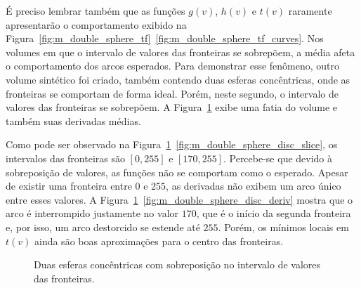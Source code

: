 	É preciso lembrar também que as funções $ g(v) $, $ h(v) $ e $ t(v) $ raramente apresentarão o comportamento exibido na Figura~\ref{fig:m_double_sphere_tf}~\ref{fig:m_double_sphere_tf_curves}. Nos volumes em que o intervalo de valores das fronteiras se sobrepõem, a média afeta o comportamento dos arcos esperados. Para demonstrar esse fenômeno, outro volume sintético foi criado, também contendo duas esferas concêntricas, onde as fronteiras se comportam de forma ideal. Porém, neste segundo, o intervalo de valores das fronteiras se sobrepõem. A Figura~\ref{fig:m_double_sphere_disc} exibe uma fatia do volume e também suas derivadas médias.
	
	Como pode ser observado na Figura~\ref{fig:m_double_sphere_disc}~\ref{fig:m_double_sphere_disc_slice}, os intervalos das fronteiras são $ [0,255] $ e $ [170,255] $. Percebe-se que devido à sobreposição de valores, as funções não se comportam como o esperado. Apesar de existir uma fronteira entre $ 0 $ e $ 255 $, as derivadas não exibem um arco único entre esses valores. A Figura~\ref{fig:m_double_sphere_disc}~\ref{fig:m_double_sphere_disc_deriv} mostra que o arco é interrompido justamente no valor $ 170 $, que é o início da segunda fronteira e, por isso, um arco destorcido se estende até $ 255 $.	Porém, os mínimos locais em $ t(v) $ ainda são boas aproximações para o centro das fronteiras.
	
\begin{figure}[h]
	\centering
	\caption{Duas esferas concêntricas com sobreposição no intervalo de valores das fronteiras.}
	\label{fig:m_double_sphere_disc}
\end{figure}
	
